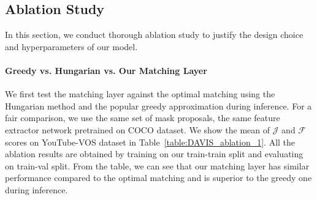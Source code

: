 \subsection{Ablation Study}\label{sec:ablation}
In this section, we conduct thorough ablation study to justify the design choice and hyperparameters of our model.
\newcommand{\colwidthA}{0.3cm}
\newcommand{\colwidthB}{0.7cm}
\begin{table}[t]
\centering
{}
\caption{Ablation study evaluated on our train-val split of YouTube-VOS. Prop. Net: mask proposal network. `+ytb': using YouTube-VOS train-train split during the training of proposal net or not. `Ft.': fine-tuning, `Arch.': architecture for the proposal net, `R50': ResNet-50, `X101': ResNetXt-101.}
\vspace{-0.2cm}
\label{table:DAVIS_ablation_1}
\end{table}







\paragraph{Greedy vs. Hungarian vs. Our Matching Layer}
We first test the matching layer against the optimal matching using the Hungarian method and the popular greedy approximation during inference.
For a fair comparison, we use the same set of mask proposals, the same feature extractor network pretrained on COCO dataset.
We show the mean of $\mathcal{J}$ and $\mathcal{F}$ scores on YouTube-VOS dataset in Table~\ref{table:DAVIS_ablation_1}. All the ablation results are obtained by training on our train-train split and evaluating on train-val split. 
From the table, we can see that our matching layer has similar performance compared to the optimal matching and is superior to the greedy one during inference.







